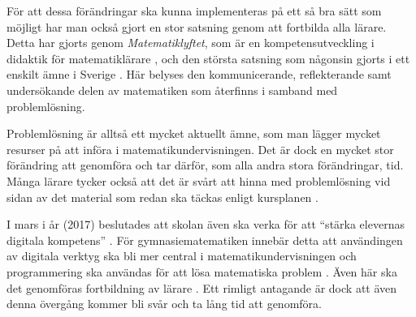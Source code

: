 \textcolor{lila}{För att dessa förändringar ska kunna implementeras på ett så bra sätt som möjligt har man också gjort en stor satsning genom att fortbilda alla lärare. Detta har gjorts genom \textsl{Matematiklyftet}, som är en kompetensutveckling i didaktik för matematiklärare \cite{Namnaren}, och den största satsning som någonsin gjorts i ett enskilt ämne i Sverige \cite{mattelyftet}. Här belyses den kommunicerande, reflekterande samt undersökande delen av matematiken som återfinns i samband med problemlösning.}
            
\textcolor{lila}{Problemlösning är alltså ett mycket aktuellt ämne, som man lägger mycket resurser på att införa i matematikundervisningen. Det är dock en mycket stor förändring att genomföra och tar därför, som alla andra stora förändringar, tid. Många lärare tycker också att det är svårt att hinna med problemlösning vid sidan av det material som redan ska täckas enligt kursplanen \cite{2016Senare}.}


\textcolor{lila}{I mars i år (2017) beslutades att skolan även ska verka för att ``stärka elevernas digitala kompetens'' \cite{regeringen}. För gymnasiematematiken innebär detta att användingen av digitala verktyg ska bli mer central i matematikundervisningen och programmering ska användas för att lösa matematiska problem \cite{itiskolan}. Även här ska det genomföras fortbildning av lärare \cite{prog_utbildning}. Ett rimligt antagande är dock att även denna övergång kommer bli svår och ta lång tid att genomföra.}
            
